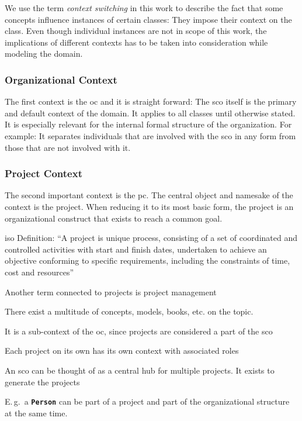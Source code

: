 \documentclass[a4paper, DIV=13, BCOR=0cm]{scrbook}
\newcommand{\Eg}{E.\,g.\ }
\newcommand{\class}[1]{\texttt{\textbf{#1}}}
\begin{document}
\label{context-switches}
We use the term \textit{context switching} in this work to describe the fact that some concepts influence instances of certain classes: They impose their context on the class. Even though individual instances are not in scope of this work, the implications of different contexts has to be taken into consideration while modeling the domain.

\subsubsection{Organizational Context}
\label{org-context}
The first context is the \gls{oc} and it is straight forward: The \gls{sco} itself is the primary and default context of the domain. It applies to all classes until otherwise stated. It is especially relevant for the internal formal structure of the organization. For example: It separates individuals that are involved with the \gls{sco} in any form from those that are not involved with it.

\subsubsection{Project Context}
\label{proj-context}
The second important context is the \gls{pc}. The central object and namesake of the context is the project. When reducing it to its most basic form, the project is an organizational construct that exists to reach a common goal.

\gls{iso} Definition: \enquote{A project is unique process, consisting of a set of coordinated and controlled activities with start and finish dates, undertaken to achieve an objective conforming to specific requirements, including the constraints of time, cost and resources} \cite{iso-9000-2015}



Another term connected to projects is project management

There exist a multitude of concepts, models, books, etc. on the topic.

It is a sub-context of the \gls{oc}, since projects are considered a part of the \gls{sco}

Each project on its own has its own context with associated roles

An \gls{sco} can be thought of as a central hub for multiple projects. It exists to generate the projects 

\Eg a \class{Person} can be part of a project and part of the organizational structure at the same time.
\end{document}
